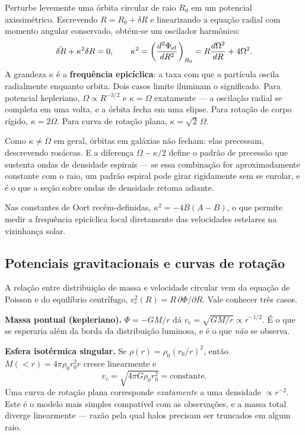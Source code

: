 \documentclass[11pt,a4paper]{article}
\begin{document}
Perturbe levemente uma órbita circular de raio $R_0$ em um potencial axissimétrico. Escrevendo $R=R_0+\delta R$ e linearizando a equação radial com momento angular conservado, obtém-se um oscilador harmônico:
\[
\ddot{\delta R}+\kappa^{2}\delta R=0,
\qquad
\kappa^{2}=\left(\frac{d^{2}\Phi_{\rm ef}}{dR^{2}}\right)_{R_0}
=R\frac{d\Omega^{2}}{dR}+4\Omega^{2}.
\]
A grandeza $\kappa$ é a \textbf{frequência epicíclica}: a taxa com que a partícula oscila radialmente enquanto orbita. Dois casos limite iluminam o significado. Para potencial kepleriano, $\Omega\propto R^{-3/2}$ e $\kappa=\Omega$ exatamente --- a oscilação radial se completa em uma volta, e a órbita fecha em uma elipse. Para rotação de corpo rígido, $\kappa=2\Omega$. Para curva de rotação plana, $\kappa=\sqrt{2}\,\Omega$.

Como $\kappa\ne\Omega$ em geral, órbitas em galáxias não fecham: elas precessam, descrevendo rosáceas. E a diferença $\Omega-\kappa/2$ define o padrão de precessão que sustenta ondas de densidade espirais --- se essa combinação for aproximadamente constante com o raio, um padrão espiral pode girar rigidamente sem se enrolar, e é o que a seção sobre ondas de densidade retoma adiante.

Nas constantes de Oort recém-definidas, $\kappa^{2}=-4B(A-B)$, o que permite medir a frequência epicíclica local diretamente das velocidades estelares na vizinhança solar.

\subsection*{Potenciais gravitacionais e curvas de rotação}

A relação entre distribuição de massa e velocidade circular vem da equação de Poisson e do equilíbrio centrífugo, $v_c^{2}(R)=R\,\partial\Phi/\partial R$. Vale conhecer três casos.

\textbf{Massa pontual (kepleriano).} $\Phi=-GM/r$ dá $v_c=\sqrt{GM/r}\propto r^{-1/2}$. É o que se esperaria além da borda da distribuição luminosa, e é o que \emph{não} se observa.

\textbf{Esfera isotérmica singular.} Se $\rho(r)=\rho_0(r_0/r)^{2}$, então $M(<r)=4\pi\rho_0r_0^{2}r$ cresce linearmente e
\[
v_c=\sqrt{4\pi G\rho_0r_0^{2}}=\text{constante}.
\]
Uma curva de rotação plana corresponde \emph{exatamente} a uma densidade $\propto r^{-2}$. Este é o modelo mais simples compatível com as observações, e a massa total diverge linearmente --- razão pela qual halos precisam ser truncados em algum raio.
\end{document}
